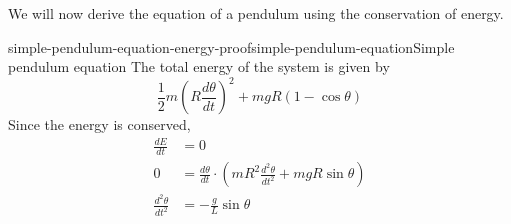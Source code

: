 \documentclass[preview]{standalone}
\begin{document}
\begin{plainhtml}
    We will now derive the equation of a pendulum using the conservation of energy.
\end{plainhtml}

\begin{snippetproof}{simple-pendulum-equation-energy-proof}{simple-pendulum-equation}{Simple pendulum equation}
    The total energy of the system is given by
    \[
        \frac{1}{2}m {\left(R\frac{d\theta}{dt}\right)}^2
        + mgR(1-\cos\theta)
    \]
    Since the energy is conserved,
    \begin{align*}
        \frac{dE}{dt} &= 0 \\
        0 &= \frac{d\theta}{dt} \cdot \left(mR^2 \frac{d^2\theta}{dt^2} + mgR\sin\theta\right) \\
        \frac{d^2\theta}{dt^2} &= -\frac{g}{L}\sin\theta
    \end{align*}
\end{snippetproof}
\end{document}
